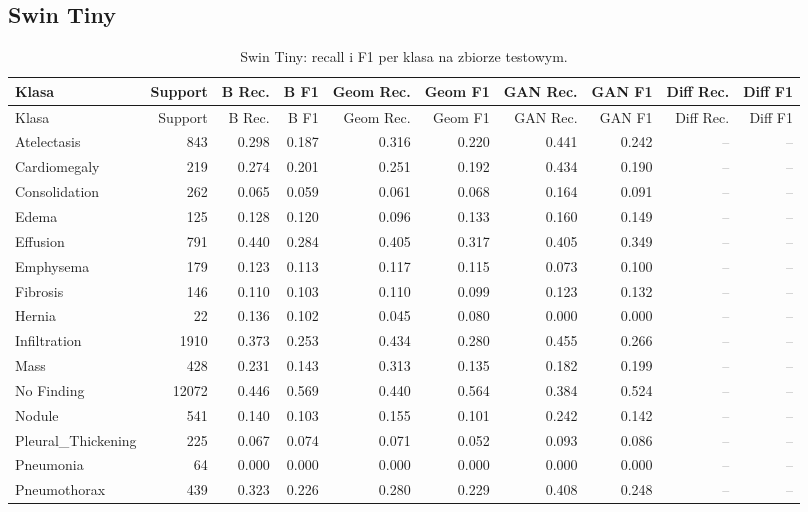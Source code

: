 \documentclass[11pt,a4paper]{article}
\newcommand{\missingresult}{\textcolor{gray}{--}}
\begin{document}
\subsection{Swin Tiny}

\scriptsize
\begin{longtable}{lrrrrrrrrr}
\caption{Swin Tiny: recall i F1 per klasa na zbiorze testowym.}
\label{tab:swin-per-class}\\
\toprule
Klasa & Support & B Rec. & B F1 & Geom Rec. & Geom F1 & GAN Rec. & GAN F1 & Diff Rec. & Diff F1 \\
\midrule
\endfirsthead
\toprule
Klasa & Support & B Rec. & B F1 & Geom Rec. & Geom F1 & GAN Rec. & GAN F1 & Diff Rec. & Diff F1 \\
\midrule
\endhead
Atelectasis & 843 & 0.298 & 0.187 & 0.316 & 0.220 & 0.441 & 0.242 & \missingresult & \missingresult \\
Cardiomegaly & 219 & 0.274 & 0.201 & 0.251 & 0.192 & 0.434 & 0.190 & \missingresult & \missingresult \\
Consolidation & 262 & 0.065 & 0.059 & 0.061 & 0.068 & 0.164 & 0.091 & \missingresult & \missingresult \\
Edema & 125 & 0.128 & 0.120 & 0.096 & 0.133 & 0.160 & 0.149 & \missingresult & \missingresult \\
Effusion & 791 & 0.440 & 0.284 & 0.405 & 0.317 & 0.405 & 0.349 & \missingresult & \missingresult \\
Emphysema & 179 & 0.123 & 0.113 & 0.117 & 0.115 & 0.073 & 0.100 & \missingresult & \missingresult \\
Fibrosis & 146 & 0.110 & 0.103 & 0.110 & 0.099 & 0.123 & 0.132 & \missingresult & \missingresult \\
Hernia & 22 & 0.136 & 0.102 & 0.045 & 0.080 & 0.000 & 0.000 & \missingresult & \missingresult \\
Infiltration & 1910 & 0.373 & 0.253 & 0.434 & 0.280 & 0.455 & 0.266 & \missingresult & \missingresult \\
Mass & 428 & 0.231 & 0.143 & 0.313 & 0.135 & 0.182 & 0.199 & \missingresult & \missingresult \\
No Finding & 12072 & 0.446 & 0.569 & 0.440 & 0.564 & 0.384 & 0.524 & \missingresult & \missingresult \\
Nodule & 541 & 0.140 & 0.103 & 0.155 & 0.101 & 0.242 & 0.142 & \missingresult & \missingresult \\
Pleural\_Thickening & 225 & 0.067 & 0.074 & 0.071 & 0.052 & 0.093 & 0.086 & \missingresult & \missingresult \\
Pneumonia & 64 & 0.000 & 0.000 & 0.000 & 0.000 & 0.000 & 0.000 & \missingresult & \missingresult \\
Pneumothorax & 439 & 0.323 & 0.226 & 0.280 & 0.229 & 0.408 & 0.248 & \missingresult & \missingresult \\
\bottomrule
\end{longtable}
\normalsize
\end{document}
